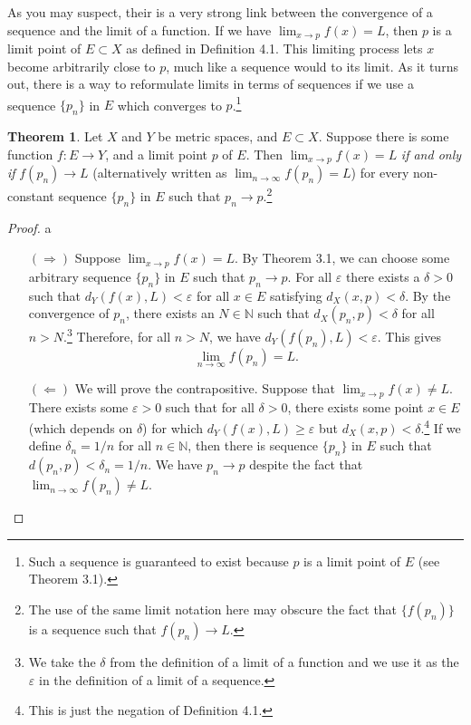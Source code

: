 \documentclass{article}
\newcommand{\N}{\mathbb{N}}
\theoremstyle{definition}
\newtheorem{theorem}{Theorem}[section]
\begin{document}
	As you may suspect, their is a very strong link between the convergence of a sequence and the limit of a function. If we have $ \lim_{x\to p}f(x)=L $, then $ p $ is a limit point of $ E\subset X $ as defined in Definition 4.1. This limiting process lets $ x $ become arbitrarily close to $ p $, much like a sequence would to its limit. As it turns out, there is a way to reformulate limits in terms of sequences if we use a sequence $ \{p_n\} $ in $ E $ which converges to $ p $.\footnote{Such a sequence is guaranteed to exist because $ p $ is a limit point of $ E $ (see Theorem 3.1).}
	\begin{theorem}
		Let $ X $ and $ Y $ be metric spaces, and $ E\subset X $. Suppose there is some function $ f:E\to Y $, and a limit point $ p $ of $ E $. Then $ \lim_{x\to p}f(x)=L $ \textit{if and only if} $ f(p_n)\to L $ (alternatively written as $ \lim_{n\to\infty}f(p_n)=L $) for every non-constant sequence $ \{p_n\} $ in $ E $ such that $ p_n\to p $.\footnote{The use of the same limit notation here may obscure the fact that $ \{f(p_n)\} $ is a sequence such that $ f(p_n)\to L $. } 
	\end{theorem} 
	\begin{proof}
		{\color{white}a}
		\begin{enumerate}
			\item [$ (\Longrightarrow) $] Suppose $ \lim_{x\to p}f(x)=L $. By Theorem 3.1, we can choose some arbitrary sequence $ \{p_n\} $ in $ E $ such that $ p_n\to p $. For all $ \varepsilon $ there exists a $ \delta>0 $ such that $ d_Y(f(x),L)<\varepsilon$ for all $ x\in E $ satisfying $ d_X(x,p)<\delta $. By the convergence of $ p_n $, there exists an $ N\in\N $ such that $ d_X(p_n,p)<\delta $ for all $ n>N $.\footnote{We take the $ \delta $ from the definition of a limit of a function and we use it as the $ \varepsilon $ in the definition of a limit of a sequence.} Therefore, for all $ n>N $, we have $d_Y(f(p_n),L)<\varepsilon$. This gives $$\lim_{n\to\infty}f(p_n)=L .$$
			\item [$ (\Longleftarrow) $] We will prove the contrapositive. Suppose that $ \lim_{x\to p}f(x)\neq L $. There exists some $ \varepsilon>0 $ such that for all $ \delta>0 $, there exists some point $ x\in E $ (which depends on $ \delta $) for which $ d_Y(f(x),L)\ge\varepsilon $ but $ d_X(x,p)<\delta $.\footnote{This is just the negation of Definition 4.1.} If we define $ \delta_n=1/n $ for all $ n\in\N $, then there is sequence $ \{p_n\} $ in $ E $ such that $ d(p_n,p)<\delta_n=1/n $. We have $ p_n\to p $ despite the fact that $ \lim_{n\to\infty}f(p_n)\neq L $. 
		\end{enumerate}
	\end{proof}
\end{document}
